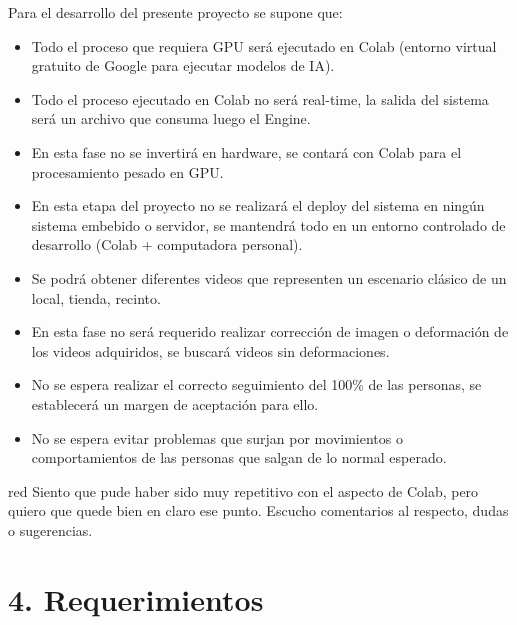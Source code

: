 \documentclass[11pt]{charter}
\begin{document}
Para el desarrollo del presente proyecto se supone que:

\begin{itemize}
\item Todo el proceso que requiera GPU será ejecutado en Colab (entorno virtual gratuito de Google para ejecutar modelos de IA).
\item Todo el proceso ejecutado en Colab no será real-time, la salida del sistema será un archivo que consuma luego el Engine.
\item En esta fase no se invertirá en hardware, se contará con Colab para el procesamiento pesado en GPU.
\item En esta etapa del proyecto no se realizará el deploy del sistema en ningún sistema embebido o servidor, se mantendrá todo en un entorno controlado de desarrollo (Colab + computadora personal).
\item Se podrá obtener diferentes videos que representen un escenario clásico de un local, tienda, recinto.
\item En esta fase no será requerido realizar corrección de imagen o deformación de los videos adquiridos, se buscará videos sin deformaciones.
\item No se espera realizar el correcto seguimiento del 100\% de las personas, se establecerá un margen de aceptación para ello.
\item No se espera evitar problemas que surjan por movimientos o comportamientos de las personas que salgan de lo normal esperado.
\end{itemize}

\begin{consigna}{red}
Siento que pude haber sido muy repetitivo con el aspecto de Colab, pero quiero que quede bien en claro ese punto. Escucho comentarios al respecto, dudas o sugerencias.
\end{consigna}

\section{4. Requerimientos}
\label{sec:requerimientos}
\end{document}
